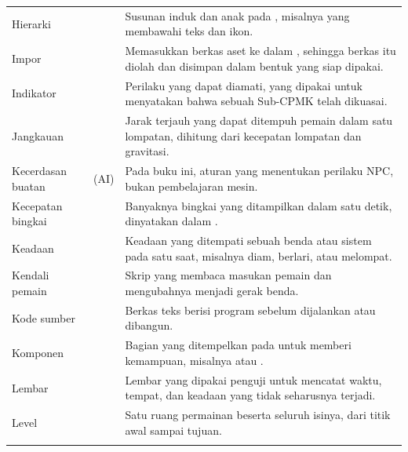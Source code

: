 \begin{longtable}{@{}L{3.9cm} L{3.6cm} L{7.2cm}@{}}
Hierarki &  &
Susunan induk dan anak pada , misalnya  yang
membawahi teks dan ikon. \\ \addlinespace

Impor &  &
Memasukkan berkas aset ke dalam , sehingga berkas itu diolah
dan disimpan dalam bentuk yang siap dipakai. \\ \addlinespace

Indikator &  &
Perilaku yang dapat diamati, yang dipakai untuk menyatakan bahwa sebuah
Sub-CPMK telah dikuasai. \\ \addlinespace

Jangkauan &  &
Jarak terjauh yang dapat ditempuh pemain dalam satu lompatan, dihitung dari
kecepatan lompatan dan gravitasi. \\ \addlinespace

Kecerdasan buatan &  (AI) &
Pada buku ini, aturan yang menentukan perilaku NPC, bukan pembelajaran mesin. \\
\addlinespace

Kecepatan bingkai &  &
Banyaknya bingkai yang ditampilkan dalam satu detik, dinyatakan dalam
. \\ \addlinespace

Keadaan &  &
Keadaan yang ditempati sebuah benda atau sistem pada satu saat, misalnya diam,
berlari, atau melompat. \\ \addlinespace

Kendali pemain &  &
Skrip yang membaca masukan pemain dan mengubahnya menjadi gerak benda. \\
\addlinespace

Kode sumber &  &
Berkas teks berisi program sebelum dijalankan atau dibangun. \\
\addlinespace

Komponen &  &
Bagian yang ditempelkan pada  untuk memberi kemampuan,
misalnya  atau . \\ \addlinespace

Lembar  &  &
Lembar yang dipakai penguji untuk mencatat waktu, tempat, dan keadaan yang
tidak seharusnya terjadi. \\ \addlinespace

Level &  &
Satu ruang permainan beserta seluruh isinya, dari titik awal sampai tujuan. \\
\addlinespace


\end{longtable}
